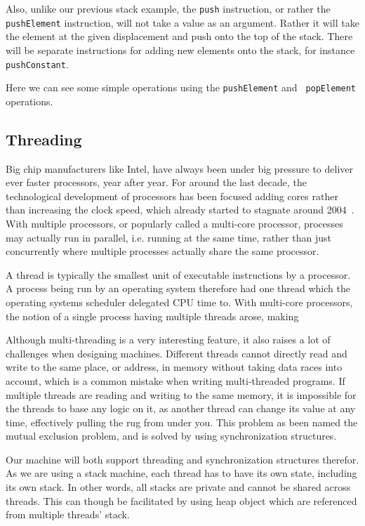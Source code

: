 Also, unlike our previous stack example, the {\tt push} instruction, or rather
the {\tt pushElement} instruction, will not take a value as an argument. Rather
it will take the element at the given displacement and push onto the top of the
stack. There will be separate instructions for adding new elements onto the
stack, for instance {\tt pushConstant}.

Here we can see some simple operations using the {\tt pushElement} and {\tt
  popElement} operations.
\begin{stackops}
\end{stackops}


\subsection{Threading}
\label{sec:design:threading}
Big chip manufacturers like Intel, have always been under big pressure to
deliver ever faster processors, year after year. For around the last decade, the
technological development of processors has been focused adding cores rather
than increasing the clock speed, which already started to stagnate around
2004~\cite{sutter}. With multiple processors, or popularly called a multi-core
processor, processes may actually run in parallel, i.e. running at the same
time, rather than just concurrently where multiple processes actually share the
same processor.

A thread is typically the smallest unit of executable instructions by a
processor. A process being run by an operating system therefore had one thread
which the operating systems scheduler delegated CPU time to. With multi-core
processors, the notion of a single process having multiple threads arose, making

Although multi-threading is a very interesting feature, it also raises a lot of
challenges when designing machines. Different threads cannot directly read and
write to the same place, or address, in memory without taking data races into
account, which is a common mistake when writing multi-threaded programs. If
multiple threads are reading and writing to the same memory, it is impossible
for the threads to base any logic on it, as another thread can change its value
at any time, effectively pulling the rug from under you. This problem as been
named the mutual exclusion problem, and is solved by using synchronization
structures.

Our machine will both support threading and synchronization structures
therefor. As we are using a stack machine, each thread has to have its own
state, including its own stack. In other words, all stacks are private and
cannot be shared across threads. This can though be facilitated by using heap
object which are referenced from multiple threads' stack.

